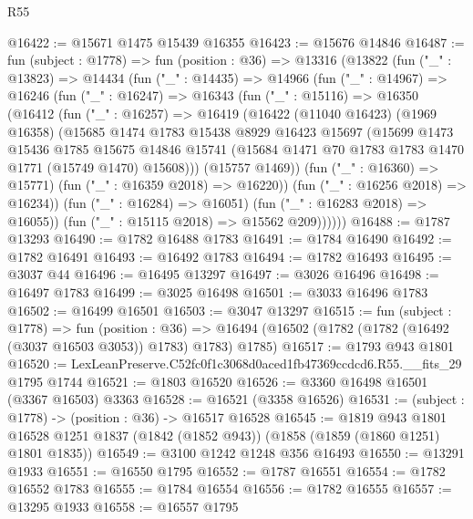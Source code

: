 \begin{lexlean}{R55}
\begin{coremodule}
@16422 := @15671 @1475 @15439 @16355
@16423 := @15676 @14846
@16487 := fun (subject : @1778) =>
  fun (position : @36) =>
  @13316
    (@13822
      (fun ("_" : @13823) =>
      @14434
        (fun ("_" : @14435) =>
        @14966
          (fun ("_" : @14967) =>
          @16246
            (fun ("_" : @16247) =>
            @16343
              (fun ("_" : @15116) =>
              @16350
                (@16412
                  (fun ("_" : @16257) =>
                  @16419
                    (@16422
                      (@11040 @16423)
                      (@1969 @16358)
                      (@15685
                        @1474
                        @1783
                        @15438
                        @8929
                        @16423
                        @15697
                        (@15699
                          @1473
                          @15436
                          @1785
                          @15675
                          @14846
                          @15741
                          (@15684 @1471 @70 @1783 @1783 @1470 @1771 (@15749 @1470) @15608)))
                      (@15757 @1469))
                    (fun ("_" : @16360) => @15771)
                    (fun ("_" : @16359 @2018) => @16220))
                  (fun ("_" : @16256 @2018) => @16234))
                (fun ("_" : @16284) => @16051)
                (fun ("_" : @16283 @2018) => @16055))
              (fun ("_" : @15115 @2018) => @15562 @209))))))
@16488 := @1787 @13293
@16490 := @1782 @16488 @1783
@16491 := @1784 @16490
@16492 := @1782 @16491
@16493 := @16492 @1783
@16494 := @1782 @16493
@16495 := @3037 @44
@16496 := @16495 @13297
@16497 := @3026 @16496
@16498 := @16497 @1783
@16499 := @3025 @16498
@16501 := @3033 @16496 @1783
@16502 := @16499 @16501
@16503 := @3047 @13297
@16515 := fun (subject : @1778) =>
  fun (position : @36) =>
  @16494 (@16502 (@1782 (@1782 (@16492 (@3037 @16503 @3053)) @1783) @1783) @1785)
@16517 := @1793 @943 @1801
@16520 := LexLeanPreserve.C52fc0f1c3068d0aced1fb47369ccdcd6.R55.__fits_29 @1795 @1744
@16521 := @1803 @16520
@16526 := @3360 @16498 @16501 (@3367 @16503) @3363
@16528 := @16521 (@3358 @16526)
@16531 := (subject : @1778) -> (position : @36) -> @16517 @16528
@16545 := @1819
    @943
    @1801
    @16528
    @1251
    @1837
    (@1842 (@1852 @943))
    (@1858 (@1859 (@1860 @1251) @1801 @1835))
@16549 := @3100 @1242 @1248 @356 @16493
@16550 := @13291 @1933
@16551 := @16550 @1795
@16552 := @1787 @16551
@16554 := @1782 @16552 @1783
@16555 := @1784 @16554
@16556 := @1782 @16555
@16557 := @13295 @1933
@16558 := @16557 @1795

\end{coremodule}
\end{lexlean}
